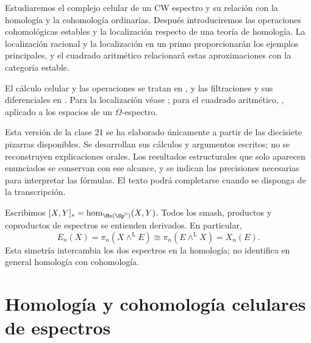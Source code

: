 
Estudiaremos el complejo celular de un CW espectro y su relación con la homología y la cohomología ordinarias. Después introduciremos las operaciones cohomológicas estables y la localización respecto de una teoría de homología. La localización racional y la localización en un primo proporcionarán los ejemplos principales, y el cuadrado aritmético relacionará estas aproximaciones con la categoría estable.

El cálculo celular y las operaciones se tratan en \cite[observación~2.6.5.5 y ejemplo~3.2.2.12]{malkiewich}, y las filtraciones y sus diferenciales en \cite[III, \S7, pp.~214--218]{adams1974}. Para la localización véase \cite[\S\S3.3 y~5.7]{malkiewich}; para el cuadrado aritmético, \cite[teorema~8.3.6]{may_ponto2012}, aplicado a los espacios de un $\Omega$-espectro.

\begin{nota}
Esta versión de la clase 21 se ha elaborado únicamente a partir de las diecisiete pizarras disponibles. Se desarrollan sus cálculos y argumentos escritos; no se reconstruyen explicaciones orales. Los resultados estructurales que solo aparecen enunciados se conservan con ese alcance, y se indican las precisiones necesarias para interpretar las fórmulas. El texto podrá completarse cuando se disponga de la transcripción.
\end{nota}

Escribimos $[X,Y]_s=\hom_{\Ho(\Sp^{\mathbb N})}(X,Y)$. Todos los smash, productos y coproductos de espectros se entienden derivados. En particular,
\[
E_n(X)=\pi_n(X\wedge^{\mathrm L}E)
\cong\pi_n(E\wedge^{\mathrm L}X)=X_n(E).
\]
Esta simetría intercambia los dos espectros en la homología; no identifica en general homología con cohomología.

\section{Homología y cohomología celulares de espectros}

